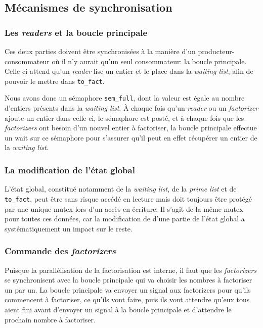 \documentclass[a4paper,10pt]{article}
\begin{document}
\subsection*{Mécanismes de synchronisation}

\subsubsection*{Les \emph{readers} et la boucle principale}

Ces deux parties doivent être synchronisées à la manière d'un producteur-consommateur où il n'y aurait qu'un seul consommateur: la boucle principale. Celle-ci attend qu'un \emph{reader} lise un entier et le place dans la \emph{waiting list}, afin de pouvoir le mettre dans \texttt{to\_fact}.

Nous avons donc un sémaphore \texttt{sem\_full}, dont la valeur est égale au nombre d'entiers présents dans la \emph{waiting list}. À chaque fois qu'un \emph{reader} ou un \emph{factorizer} ajoute un entier dans celle-ci, le sémaphore est posté, et à chaque fois que les \emph{factorizers} ont besoin d'un nouvel entier à factoriser, la boucle principale effectue un wait sur ce sémaphore pour s'assurer qu'il peut en effet récupérer un entier de la \emph{waiting list}.

\subsubsection*{La modification de l'état global}

L'état global, constitué notamment de la \emph{waiting list}, de la \emph{prime list} et de \texttt{to\_fact}, peut être sans risque accédé en lecture mais doit toujours être protégé par une unique mutex lors d'un accès en écriture. Il s'agit de la même mutex pour toutes ces données, car la modification de d'une partie de l'état global a systématiquement un impact sur le reste.

\subsubsection*{Commande des \emph{factorizers}}

Puisque la parallélisation de la factorisation est interne, il faut que les \emph{factorizers} se synchronisent avec la boucle principale qui va choisir les nombres à factoriser un par un. La boucle principale va envoyer un signal aux factorizers pour qu'ils commencent à factoriser, ce qu'ils vont faire, puis ils vont attendre qu'eux tous aient fini avant d'envoyer un signal à la boucle principale et d'attendre le prochain nombre à factoriser.
\end{document}
